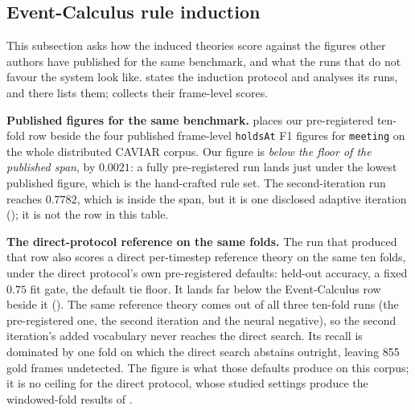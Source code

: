 \subsection{Event-Calculus rule induction}\label{sec:ec-eval}

This subsection asks how the induced theories score against the figures other authors have published for the same benchmark, and what the runs that do not favour the system look like.  states the induction protocol and analyses its runs, and  there lists them;  collects their frame-level scores.

\textbf{Published figures for the same benchmark.}  places our pre-registered ten-fold row beside the four published frame-level \texttt{holdsAt} F1 figures for \texttt{meeting} on the whole distributed CAVIAR corpus. Our figure is \emph{below the floor of the published span}, by $0.0021$: a fully pre-registered run lands just under the lowest published figure, which is the hand-crafted rule set. The second-iteration run reaches $0.7782$, which is inside the span, but it is one disclosed adaptive iteration (); it is not the row in this table.

\textbf{The direct-protocol reference on the same folds.} The run that produced that row also scores a direct per-timestep reference theory on the same ten folds, under the direct protocol's own pre-registered defaults: held-out accuracy, a fixed $0.75$ fit gate, the default tie floor. It lands far below the Event-Calculus row beside it (). The same reference theory comes out of all three ten-fold runs (the pre-registered one, the second iteration and the neural negative), so the second iteration's added vocabulary never reaches the direct search. Its recall is dominated by one fold on which the direct search abstains outright, leaving 855 gold frames undetected. The figure is what those defaults produce on this corpus; it is no ceiling for the direct protocol, whose studied settings produce the windowed-fold results of .

